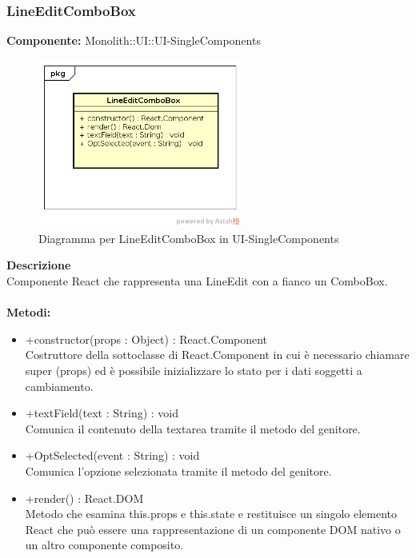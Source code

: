 \clearpage

\subsubsection{LineEditComboBox}
\textbf{Componente:}  Monolith::UI::UI-SingleComponents\\
   \FloatBarrier
   \begin{figure}[ht]
   \centering
   \includegraphics[width=0.6\textwidth]{img/single-LineEditComboBox}
   \caption{{Diagramma per LineEditComboBox in UI-SingleComponents}}
\end{figure}
\FloatBarrier
\textbf{Descrizione}\\
Componente React che rappresenta una LineEdit con a fianco un ComboBox. \\\\
\textbf{Metodi:} \begin{itemize}\item +constructor(props : Object) : React.Component \\Costruttore della sottoclasse di React.Component in cui è necessario chiamare super (props) ed è possibile inizializzare lo stato per i dati soggetti a cambiamento.\item +textField(text : String) : void \\Comunica il contenuto della textarea tramite il metodo del genitore. \item +OptSelected(event : String) : void  \\Comunica l’opzione selezionata tramite il metodo del genitore.\item +render() : React.DOM \\Metodo che esamina this.props e this.state e restituisce un singolo elemento React che può essere una rappresentazione di un componente DOM nativo o un altro componente composito.\end{itemize} 


